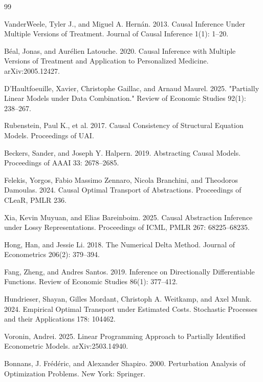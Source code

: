 \documentclass{article}
\begin{document}
\begin{thebibliography}{99}

   VanderWeele, Tyler J., and Miguel A. Hernán. 2013. Causal Inference Under Multiple Versions of Treatment. Journal of Causal Inference 1(1): 1--20.

   Béal, Jonas, and Aurélien Latouche. 2020. Causal Inference with Multiple Versions of Treatment and Application to Personalized Medicine. arXiv:2005.12427.

   D'Haultfoeuille, Xavier, Christophe Gaillac, and Arnaud Maurel. 2025. "Partially Linear Models under Data Combination." Review of Economic Studies 92(1): 238--267.

   Rubenstein, Paul K., et al. 2017. Causal Consistency of Structural Equation Models. Proceedings of UAI.

   Beckers, Sander, and Joseph Y. Halpern. 2019. Abstracting Causal Models. Proceedings of AAAI 33: 2678--2685.

   Felekis, Yorgos, Fabio Massimo Zennaro, Nicola Branchini, and Theodoros Damoulas. 2024. Causal Optimal Transport of Abstractions. Proceedings of CLeaR, PMLR 236.

   Xia, Kevin Muyuan, and Elias Bareinboim. 2025. Causal Abstraction Inference under Lossy Representations. Proceedings of ICML, PMLR 267: 68225--68235.

   Hong, Han, and Jessie Li. 2018. The Numerical Delta Method. Journal of Econometrics 206(2): 379--394.

   Fang, Zheng, and Andres Santos. 2019. Inference on Directionally Differentiable Functions. Review of Economic Studies 86(1): 377--412.

   Hundrieser, Shayan, Gilles Mordant, Christoph A. Weitkamp, and Axel Munk. 2024. Empirical Optimal Transport under Estimated Costs. Stochastic Processes and their Applications 178: 104462.

   Voronin, Andrei. 2025. Linear Programming Approach to Partially Identified Econometric Models. arXiv:2503.14940.

   Bonnans, J. Frédéric, and Alexander Shapiro. 2000. Perturbation Analysis of Optimization Problems. New York: Springer.


\end{thebibliography}
\end{document}
